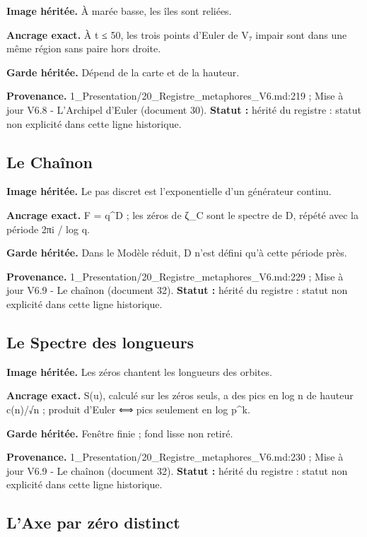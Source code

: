 \documentclass[
  9pt,
  a4paper,
]{article}
\begin{document}
\textbf{Image héritée.} À marée basse, les îles sont reliées.

\textbf{Ancrage exact.} À \textbar t\textbar{} ≤ 50, les trois points
d'Euler de V₇ impair sont dans une même région sans paire hors droite.

\textbf{Garde héritée.} Dépend de la carte et de la hauteur.

\textbf{Provenance.} 1\_Presentation/20\_Registre\_metaphores\_V6.md:219
; Mise à jour V6.8 - L'Archipel d'Euler (document 30). \textbf{Statut :}
hérité du registre : statut non explicité dans cette ligne historique.

\hypertarget{le-chauxeenon}{%
\subsection{Le Chaînon}\label{le-chauxeenon}}

\textbf{Image héritée.} Le pas discret est l'exponentielle d'un
générateur continu.

\textbf{Ancrage exact.} F = q\^{}D ; les zéros de ζ\_C sont le spectre
de D, répété avec la période 2πi / log q.

\textbf{Garde héritée.} Dans le Modèle réduit, D n'est défini qu'à cette
période près.

\textbf{Provenance.} 1\_Presentation/20\_Registre\_metaphores\_V6.md:229
; Mise à jour V6.9 - Le chaînon (document 32). \textbf{Statut :} hérité
du registre : statut non explicité dans cette ligne historique.

\hypertarget{le-spectre-des-longueurs}{%
\subsection{Le Spectre des longueurs}\label{le-spectre-des-longueurs}}

\textbf{Image héritée.} Les zéros chantent les longueurs des orbites.

\textbf{Ancrage exact.} S(u), calculé sur les zéros seuls, a des pics en
log n de hauteur c(n)/√n ; produit d'Euler ⟺ pics seulement en log
p\^{}k.

\textbf{Garde héritée.} Fenêtre finie ; fond lisse non retiré.

\textbf{Provenance.} 1\_Presentation/20\_Registre\_metaphores\_V6.md:230
; Mise à jour V6.9 - Le chaînon (document 32). \textbf{Statut :} hérité
du registre : statut non explicité dans cette ligne historique.

\hypertarget{laxe-par-zuxe9ro-distinct}{%
\subsection{L'Axe par zéro distinct}\label{laxe-par-zuxe9ro-distinct}}
\end{document}
